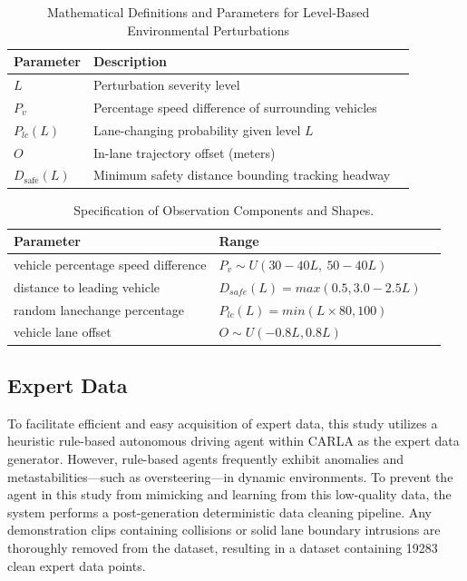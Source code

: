     \begin{table}[htbp]
    \centering
    \caption{Mathematical Definitions and Parameters for Level-Based Environmental Perturbations}
    \label{tab:perturbation_parameters}
    \begin{tabular}{llc}
    \toprule
    \textbf{Parameter} & \textbf{Description} \\ \midrule
    $L$ & Perturbation severity level \\
    $P_v$ & Percentage speed difference of surrounding vehicles \\
    $P_{lc}(L)$ & Lane-changing probability given level $L$ \\
    $O$ & In-lane trajectory offset (meters) \\
    $D_{\text{safe}}(L)$ & Minimum safety distance bounding tracking headway \\ 
    \bottomrule
    \end{tabular}
    \end{table}
    
    \begin{table}[htbp]
    \centering
    \caption{Specification of Observation Components and Shapes.}
    \label{tab:observation_shapes}
    \begin{tabular}{lll}
    \toprule
    \textbf{Parameter} & \textbf{Range} \\
    \midrule
    vehicle percentage speed difference & $P_v \sim U(30 - 40L, \ 50 - 40L)$  \\
    \addlinespace
    distance to leading vehicle & $D_{safe}(L)=max(0.5,3.0-2.5L)$ \\
    \addlinespace
    random lanechange percentage   & $P_{lc}(L)=min(L\times80,100)$ \\
    \addlinespace
    vehicle lane offset   & $O \sim U(-0.8L,0.8L)$ \\
    \bottomrule
    \end{tabular}
    \end{table}

    \subsection{Expert Data}
    To facilitate efficient and easy acquisition of expert data, this study utilizes a heuristic rule-based autonomous driving agent within CARLA as the expert data generator. However, rule-based agents frequently exhibit anomalies and metastabilities—such as oversteering—in dynamic environments. To prevent the agent in this study from mimicking and learning from this low-quality data, the system performs a post-generation deterministic data cleaning pipeline. Any demonstration clips containing collisions or solid lane boundary intrusions are thoroughly removed from the dataset, resulting in a dataset containing 19283 clean expert data points.

